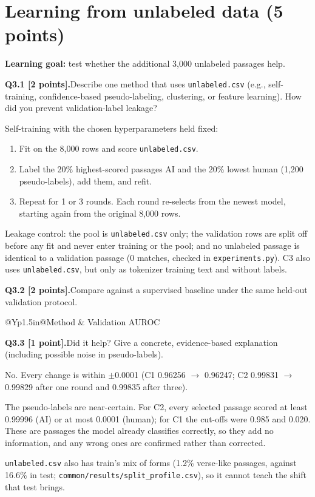 \documentclass[11pt,letterpaper]{article}
\newcommand{\question}[2]{\needspace{4\baselineskip}\par\addvspace{0.45em}\noindent\textbf{#1}\quad #2\par\nobreak\vspace{0.1em}}
\begin{document}
\section{Learning from unlabeled data (5 points)}
\textbf{Learning goal:} test whether the additional 3,000 unlabeled passages help.
\question{Q3.1 [2 points].}{Describe one method that uses \texttt{unlabeled.csv} (e.g., self-training, confidence-based pseudo-labeling, clustering, or feature learning). How did you prevent validation-label leakage?}
Self-training with the chosen hyperparameters held fixed:
\begin{enumerate}
\item Fit on the 8,000 rows and score \texttt{unlabeled.csv}.
\item Label the 20\% highest-scored passages AI and the 20\% lowest human (1,200 pseudo-labels), add them, and refit.
\item Repeat for 1 or 3 rounds. Each round re-selects from the newest model, starting again from the original 8,000 rows.
\end{enumerate}
Leakage control: the pool is \texttt{unlabeled.csv} only; the validation rows are split off before any fit and never enter training or the pool; and no unlabeled passage is identical to a validation passage (0 matches, checked in \texttt{experiments.py}). C3 also uses \texttt{unlabeled.csv}, but only as tokenizer training text and without labels.
\question{Q3.2 [2 points].}{Compare against a supervised baseline under the same held-out validation protocol.}
\begin{tabularx}{\linewidth}{@{}Yp{1.5in}@{}}\toprule Method & Validation AUROC \\ \midrule
{}
\bottomrule\end{tabularx}
\question{Q3.3 [1 point].}{Did it help? Give a concrete, evidence-based explanation (including possible noise in pseudo-labels).}
No. Every change is within $\pm$0.0001 (C1 0.96256 $\to$ 0.96247; C2 0.99831 $\to$ 0.99829 after one round and 0.99835 after three).

The pseudo-labels are near-certain. For C2, every selected passage scored at least 0.99996 (AI) or at most 0.0001 (human); for C1 the cut-offs were 0.985 and 0.020. These are passages the model already classifies correctly, so they add no information, and any wrong ones are confirmed rather than corrected.

{\raggedright \texttt{unlabeled.csv} also has train's mix of forms (1.2\% verse-like passages, against 16.6\% in test; \texttt{common/results/split\_profile.csv}), so it cannot teach the shift that test brings.\par}
\end{document}
